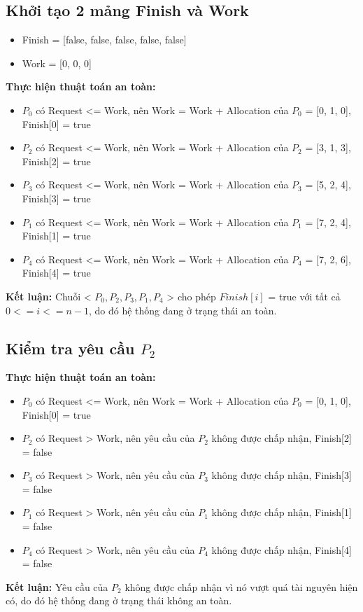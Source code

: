 \documentclass[12pt, letterpaper]{article}
\begin{document}
\subsection{Khởi tạo 2 mảng Finish và Work}
\begin{itemize}
    \item Finish = [false, false, false, false, false]
    \item Work = [0, 0, 0]
\end{itemize}

\noindent \textbf{Thực hiện thuật toán an toàn:}
\begin{itemize}
    \item $P_0$ có Request <= Work, nên Work = Work + Allocation của $P_0$ = [0, 1, 0], Finish[0] = true
    \item $P_2$ có Request <= Work, nên Work = Work + Allocation của $P_2$ = [3, 1, 3], Finish[2] = true
    \item $P_3$ có Request <= Work, nên Work = Work + Allocation của $P_3$ = [5, 2, 4], Finish[3] = true
    \item $P_1$ có Request <= Work, nên Work = Work + Allocation của $P_1$ = [7, 2, 4], Finish[1] = true
    \item $P_4$ có Request <= Work, nên Work = Work + Allocation của $P_4$ = [7, 2, 6], Finish[4] = true
\end{itemize}

\noindent \textbf{Kết luận:} Chuỗi < $P_0, P_2, P_3, P_1, P_4$ > cho phép $Finish[i]$ = true với tất cả $0 <= i <= n - 1$, do đó hệ thống đang ở trạng thái an toàn.

\subsection{Kiểm tra yêu cầu $P_2$}
\noindent \textbf{Thực hiện thuật toán an toàn:}
\begin{itemize}
    \item $P_0$ có Request <= Work, nên Work = Work + Allocation của $P_0$ = [0, 1, 0], Finish[0] = true
    \item $P_2$ có Request > Work, nên yêu cầu của $P_2$ không được chấp nhận, Finish[2] = false
    \item $P_3$ có Request > Work, nên yêu cầu của $P_3$ không được chấp nhận, Finish[3] = false
    \item $P_1$ có Request > Work, nên yêu cầu của $P_1$ không được chấp nhận, Finish[1] = false
    \item $P_4$ có Request > Work, nên yêu cầu của $P_4$ không được chấp nhận, Finish[4] = false
\end{itemize}

\noindent \textbf{Kết luận:} Yêu cầu của $P_2$ không được chấp nhận vì nó vượt quá tài nguyên hiện có, do đó hệ thống đang ở trạng thái không an toàn.
\end{document}
